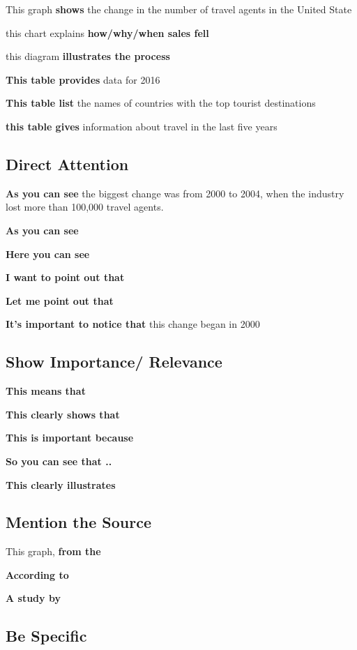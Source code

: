 \documentclass{article}
\begin{document}
This graph \textbf{shows} the change in the number of travel agents in the United State

this chart explains \textbf{how/why/when sales fell}

this diagram \textbf{illustrates the process}

\textbf{This table provides} data for 2016

\textbf{This table list} the names of countries with the top tourist destinations

\textbf{this table gives} information about travel in the last five years

\subsection{Direct Attention}

\textbf{As you can see} the biggest change was from 2000 to 2004, when the industry lost more than 100,000 travel agents.

\textbf{As you can see}

\textbf{Here you can see}

\textbf{I want to point out that}

\textbf{Let me point out that }

\textbf{It's important to notice that} this change began in 2000

\subsection{Show Importance/ Relevance}

\textbf{This means that }

\textbf{This clearly shows that}

\textbf{This is important because}

\textbf{So you can see that .. }

\textbf{This clearly illustrates}

\subsection{Mention the Source}

This graph, \textbf{from the}

\textbf{According to}

\textbf{A study by}

\subsection{Be Specific}
\end{document}
